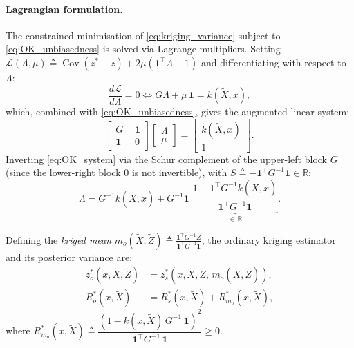 \paragraph{Lagrangian formulation.} The constrained minimisation of
\eqref{eq:kriging_variance} subject to \eqref{eq:OK_unbiasedness} is solved
via Lagrange multipliers. Setting $\mathcal{L}(\Lambda, \mu) \triangleq
\operatorname{Cov}(z^* - z) + 2\mu(\mathbf{1}^\top\Lambda - 1)$ and
differentiating with respect to $\Lambda$:
\begin{equation}
    \frac{d\mathcal{L}}{d\Lambda} = 0
    \iff G\Lambda + \mu\,\mathbf{1} = k(\tilde{X}, x),
    \label{eq:OK_stationarity}
\end{equation}
which, combined with \eqref{eq:OK_unbiasedness}, gives the augmented linear
system:
\begin{equation}
    \begin{bmatrix} G & \mathbf{1} \\ \mathbf{1}^\top & 0 \end{bmatrix}
    \begin{bmatrix} \Lambda \\ \mu \end{bmatrix}
    =
    \begin{bmatrix} k(\tilde{X}, x) \\ 1 \end{bmatrix}.
    \label{eq:OK_system}
\end{equation}
Inverting \eqref{eq:OK_system} via the Schur complement of the upper-left
block $G$ (since the lower-right block $0$ is not invertible), with $S
\triangleq -\mathbf{1}^\top G^{-1} \mathbf{1} \in \mathbb{R}$:
\begin{equation}
    \Lambda = G^{-1}k(\tilde{X},x)
    + G^{-1}\mathbf{1}\;\underbrace{\frac{1 - \mathbf{1}^\top G^{-1}
    k(\tilde{X},x)}{\mathbf{1}^\top G^{-1}\mathbf{1}}}_{\in\,\mathbb{R}}.
    \label{eq:OK_weights}
\end{equation}

\begin{proposition}
    \label{prop:ordinary_kriging}
    Defining the \emph{kriged mean} $m_o(\tilde{X}, \tilde{Z}) \triangleq
    \frac{\mathbf{1}^\top G^{-1} \tilde{Z}}{\mathbf{1}^\top G^{-1}
    \mathbf{1}}$, the ordinary kriging estimator and its posterior variance are:
    \begin{align}
        z^*_o(x, \tilde{X}, \tilde{Z})
        &= z^*_s(x, \tilde{X}, \tilde{Z},\, m_o(\tilde{X}, \tilde{Z})),
        \label{eq:OK_estimator} \\
        R^*_o(x, \tilde{X})
        &= R^*_s(x, \tilde{X}) + R^*_{m_o}(x, \tilde{X}),
        \label{eq:OK_variance}
    \end{align}
    where $R^*_{m_o}(x, \tilde{X}) \triangleq
    \dfrac{\left(1 - k(x,\tilde{X})\,G^{-1}\,\mathbf{1}\right)^2}
    {\mathbf{1}^\top G^{-1}\,\mathbf{1}} \geq 0$.
\end{proposition}

